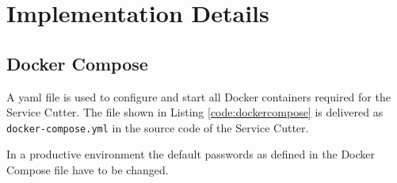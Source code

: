 \chapter{Implementation Details}
\label{appendix:implementationDetails}

\section{Docker Compose}
\label{appendix:dockerCompose}

A \gls{yaml} file is used to configure and start all Docker containers required for the Service Cutter. The file shown in Listing \ref{code:dockercompose} is delivered as \texttt{docker-compose.yml} in the source code of the Service Cutter.

In a productive environment the default passwords as defined in the Docker Compose file have to be changed.


